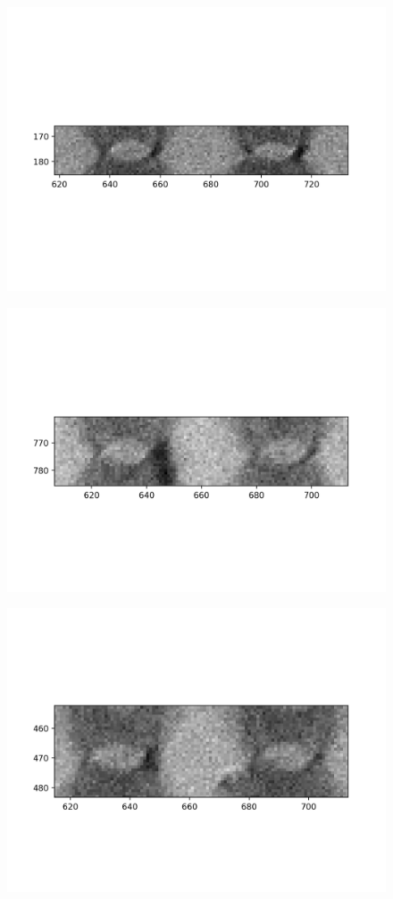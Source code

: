 \documentclass[10pt,a4paper]{article}
\begin{document}
	\begin{figure}[h]
		\includegraphics{data/image_stamps/e12}
	\end{figure}
	\begin{figure}[h]
		\includegraphics{data/image_stamps/f1}
	\end{figure}
	\begin{figure}[h]
		\includegraphics{data/image_stamps/f2}
	\end{figure}
\end{document}
